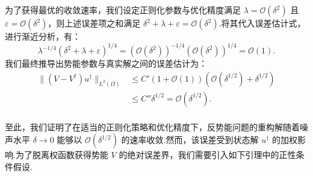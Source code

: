 为了获得最优的收敛速率，我们设定正则化参数与优化精度满足 $\lambda=\mathcal{O}(\delta^2)$ 且 $\varepsilon=\mathcal{O}(\delta^2)$，则上述误差项之和满足 $\delta^2+\lambda+\varepsilon = \mathcal{O}(\delta^2)$.将其代入误差估计式，进行渐近分析，有：
$$\lambda^{-1/4}(\delta^2+\lambda+\varepsilon)^{1/4} = \left(\mathcal{O}(\delta^2)\right)^{-1/4}\left(\mathcal{O}(\delta^2)\right)^{1/4} = \mathcal{O}(1).$$
我们最终推导出势能参数与真实解之间的误差估计为：
\begin{equation}\label{eq:pinnconverge}
\begin{aligned}
\|(V-V^{\dagger})u^{\dagger}\|_{L^{2}(\Omega)} &\leq C' \left( 1 + \mathcal{O}(1) \right) \left( \mathcal{O}(\delta^{1/2}) + \delta^{1/2} \right) \\
&\leq C'' \delta^{1/2} = \mathcal{O}(\delta^{1/2}).\\
\end{aligned}
\end{equation}

至此，我们证明了在适当的正则化策略和优化精度下，反势能问题的重构解随着噪声水平 $\delta \to 0$ 能够以 $\mathcal{O}(\delta^{1/2})$ 的速率收敛.然而，该误差受到状态解 $u^\dagger$ 的加权影响.为了脱离权函数获得势能 $V$ 的绝对误差界，我们需要引入如下引理中的正性条件假设.

